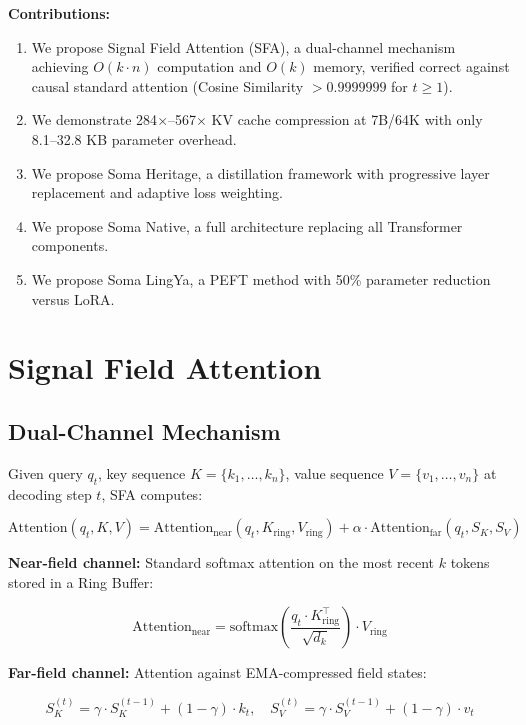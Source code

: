 \documentclass[11pt]{article}
\begin{document}
\textbf{Contributions:}
\begin{enumerate}
    \item We propose Signal Field Attention (SFA), a dual-channel mechanism achieving $O(k \cdot n)$ computation and $O(k)$ memory, verified correct against causal standard attention (Cosine Similarity $> 0.9999999$ for $t \geq 1$).
    \item We demonstrate 284$\times$--567$\times$ KV cache compression at 7B/64K with only 8.1--32.8 KB parameter overhead.
    \item We propose Soma Heritage, a distillation framework with progressive layer replacement and adaptive loss weighting.
    \item We propose Soma Native, a full architecture replacing all Transformer components.
    \item We propose Soma LingYa, a PEFT method with 50\% parameter reduction versus LoRA.
\end{enumerate}

\section{Signal Field Attention}

\subsection{Dual-Channel Mechanism}

Given query $q_t$, key sequence $K = \{k_1, \dots, k_n\}$, value sequence $V = \{v_1, \dots, v_n\}$ at decoding step $t$, SFA computes:

\begin{equation}
\text{Attention}(q_t, K, V) = \text{Attention}_{\text{near}}(q_t, K_{\text{ring}}, V_{\text{ring}}) + \alpha \cdot \text{Attention}_{\text{far}}(q_t, S_K, S_V)
\label{eq:sfa}
\end{equation}

\noindent\textbf{Near-field channel:} Standard softmax attention on the most recent $k$ tokens stored in a Ring Buffer:

\begin{equation}
\text{Attention}_{\text{near}} = \text{softmax}\left(\frac{q_t \cdot K_{\text{ring}}^\top}{\sqrt{d_k}}\right) \cdot V_{\text{ring}}
\end{equation}

\noindent\textbf{Far-field channel:} Attention against EMA-compressed field states:

\begin{equation}
S_K^{(t)} = \gamma \cdot S_K^{(t-1)} + (1-\gamma) \cdot k_t, \quad
S_V^{(t)} = \gamma \cdot S_V^{(t-1)} + (1-\gamma) \cdot v_t
\end{equation}
\end{document}
